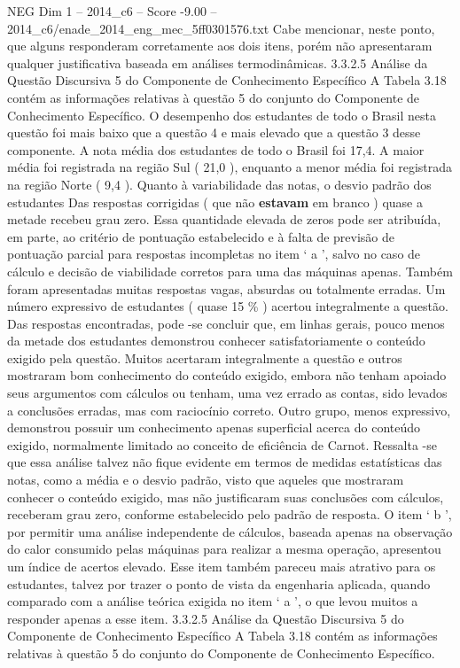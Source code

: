 \begin{textsample}{NEG Dim 1 – 2014\_c6 – Score -9.00 – 2014\_c6/enade\_2014\_eng\_mec\_5ff0301576.txt}
Cabe mencionar, neste ponto, que alguns responderam corretamente aos dois itens, porém não apresentaram qualquer justificativa baseada em análises termodinâmicas. 3.3.2.5 Análise da Questão Discursiva 5 do Componente de Conhecimento Específico A Tabela 3.18 contém as informações relativas à questão 5 do conjunto do Componente de Conhecimento Específico.
O desempenho dos estudantes de todo o Brasil nesta questão foi mais baixo que a questão 4 e mais elevado que a questão 3 desse componente.
A nota média dos estudantes de todo o Brasil foi 17,4.
A maior média foi registrada na região Sul ( 21,0 ), enquanto a menor média foi registrada na região Norte ( 9,4 ).
Quanto à variabilidade das notas, o desvio padrão dos estudantes Das respostas corrigidas ( que não \textbf{estavam} em branco ) quase a metade recebeu grau zero.
Essa quantidade elevada de zeros pode ser atribuída, em parte, ao critério de pontuação estabelecido e à falta de previsão de pontuação parcial para respostas incompletas no item ‘ a ’, salvo no caso de cálculo e decisão de viabilidade corretos para uma das máquinas apenas.
Também foram apresentadas muitas respostas vagas, absurdas ou totalmente erradas.
Um número expressivo de estudantes ( quase 15 \% ) acertou integralmente a questão.
Das respostas encontradas, pode -se concluir que, em linhas gerais, pouco menos da metade dos estudantes demonstrou conhecer satisfatoriamente o conteúdo exigido pela questão.
Muitos acertaram integralmente a questão e outros mostraram bom conhecimento do conteúdo exigido, embora não tenham apoiado seus argumentos com cálculos ou tenham, uma vez errado as contas, sido levados a conclusões erradas, mas com raciocínio correto.
Outro grupo, menos expressivo, demonstrou possuir um conhecimento apenas superficial acerca do conteúdo exigido, normalmente limitado ao conceito de eficiência de Carnot.
Ressalta -se que essa análise talvez não fique evidente em termos de medidas estatísticas das notas, como a média e o desvio padrão, visto que aqueles que mostraram conhecer o conteúdo exigido, mas não justificaram suas conclusões com cálculos, receberam grau zero, conforme estabelecido pelo padrão de resposta.
O item ‘ b ’, por permitir uma análise independente de cálculos, baseada apenas na observação do calor consumido pelas máquinas para realizar a mesma operação, apresentou um índice de acertos elevado.
Esse item também pareceu mais atrativo para os estudantes, talvez por trazer o ponto de vista da engenharia aplicada, quando comparado com a análise teórica exigida no item ‘ a ’, o que levou muitos a responder apenas a esse item. 3.3.2.5 Análise da Questão Discursiva 5 do Componente de Conhecimento Específico A Tabela 3.18 contém as informações relativas à questão 5 do conjunto do Componente de Conhecimento Específico.

\end{textsample}
